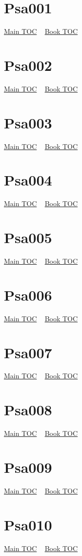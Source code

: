 \documentclass{book}
\begin{document}
  \section{Psa001}\hyperlink{toc}{Main TOC} ~ \hyperref[subsec:Psa]{Book TOC} 
  \section{Psa002}\hyperlink{toc}{Main TOC} ~ \hyperref[subsec:Psa]{Book TOC} 
  \section{Psa003}\hyperlink{toc}{Main TOC} ~ \hyperref[subsec:Psa]{Book TOC} 
  \section{Psa004}\hyperlink{toc}{Main TOC} ~ \hyperref[subsec:Psa]{Book TOC} 
  \section{Psa005}\hyperlink{toc}{Main TOC} ~ \hyperref[subsec:Psa]{Book TOC} 
  \section{Psa006}\hyperlink{toc}{Main TOC} ~ \hyperref[subsec:Psa]{Book TOC} 
  \section{Psa007}\hyperlink{toc}{Main TOC} ~ \hyperref[subsec:Psa]{Book TOC} 
  \section{Psa008}\hyperlink{toc}{Main TOC} ~ \hyperref[subsec:Psa]{Book TOC} 
  \section{Psa009}\hyperlink{toc}{Main TOC} ~ \hyperref[subsec:Psa]{Book TOC} 
  \section{Psa010}\hyperlink{toc}{Main TOC} ~ \hyperref[subsec:Psa]{Book TOC} 
\end{document}
